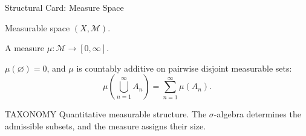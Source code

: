 \begin{remark*}
\begin{structureblueprint}{Structural Card: Measure Space}
\begin{structureinherits}
Measurable space \((X,\mathcal M)\).
\end{structureinherits}
\begin{structurenew}
A measure \(\mu:\mathcal M\to[0,\infty]\).
\end{structurenew}
\begin{structuretheory}
\(\mu(\varnothing)=0\), and \(\mu\) is countably additive on pairwise disjoint
measurable sets:
\[
  \mu\!\left(\bigcup_{n=1}^{\infty}A_n\right)
  =
  \sum_{n=1}^{\infty}\mu(A_n).
\]
\end{structuretheory}
\begin{structuresection}{TAXONOMY}
Quantitative measurable structure.  The \(\sigma\)-algebra determines the
admissible subsets, and the measure assigns their size.
\end{structuresection}
\end{structureblueprint}
\end{remark*}
